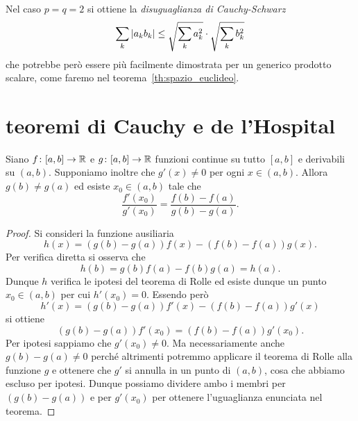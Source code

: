 Nel caso $p=q=2$ si ottiene la 
\emph{disuguaglianza di Cauchy-Schwarz}%
%
%
%
%
\[
   \sum_k {\left|a_k b_k\right|} \le \sqrt{\sum_k a_k^2} \cdot \sqrt{\sum_k b_k^2}
\]
che potrebbe però essere più facilmente dimostrata 
per un generico prodotto scalare, come faremo 
nel teorema~\ref{th:spazio_euclideo}.

\section{teoremi di Cauchy e de l'Hospital}

\begin{theorem}[Cauchy]
\label{th:cauchy}%
\mymark{**}%
%
%
%
Siano $f\colon[a,b]\to {\mathbb R}$ e $g\colon[a,b]\to {\mathbb R}$ funzioni continue su tutto $[a,b]$ e derivabili su $(a,b)$.
Supponiamo inoltre che $g'(x)\neq 0$ per ogni $x\in (a,b)$.
Allora $g(b) \neq g(a)$ ed esiste $x_0\in(a,b)$ tale che
\[
  \frac{f'(x_0)}{g'(x_0)} = \frac{f(b)-f(a)}{g(b)-g(a)}.
\]
\end{theorem}
%
\begin{proof}
\mymark{**}
Si consideri la funzione ausiliaria
\[
 h(x) = (g(b)-g(a))f(x) - (f(b)-f(a))g(x).
\]
Per verifica diretta si osserva che
\[
  h(b) = g(b)f(a) - f(b)g(a) = h(a).
\]
Dunque $h$ verifica le ipotesi del teorema di Rolle ed esiste
dunque un punto $x_0\in(a,b)$ per cui $h'(x_0) = 0$.
Essendo però
\[
  h'(x) = (g(b) - g(a)) f'(x) - (f(b)-f(a)) g'(x)
\]
si ottiene
\[
 (g(b)-g(a))f'(x_0) = (f(b) - f(a))g'(x_0).
\]
Per ipotesi sappiamo che $g'(x_0)\neq 0$.
Ma necessariamente anche $g(b) - g(a)\neq 0$ perché altrimenti potremmo applicare il teorema di Rolle alla funzione $g$ e ottenere che $g'$ si annulla in un punto di $(a,b)$, cosa che abbiamo escluso per ipotesi.
Dunque possiamo dividere ambo i membri per $(g(b)-g(a))$ e per $g'(x_0)$ per ottenere l'uguaglianza enunciata nel teorema.
\end{proof}

